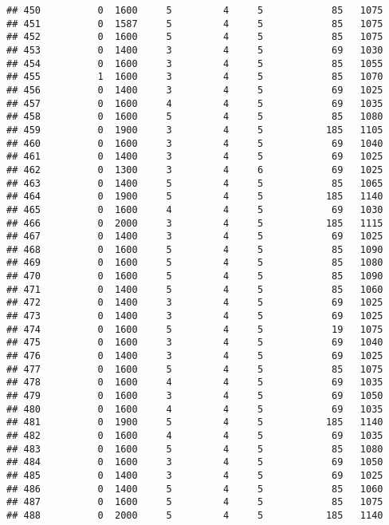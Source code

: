 \documentclass[]{article}
\begin{document}
\begin{verbatim}
## 450          0  1600     5         4     5            85   1075
## 451          0  1587     5         4     5            85   1075
## 452          0  1600     5         4     5            85   1075
## 453          0  1400     3         4     5            69   1030
## 454          0  1600     3         4     5            85   1055
## 455          1  1600     3         4     5            85   1070
## 456          0  1400     3         4     5            69   1025
## 457          0  1600     4         4     5            69   1035
## 458          0  1600     5         4     5            85   1080
## 459          0  1900     3         4     5           185   1105
## 460          0  1600     3         4     5            69   1040
## 461          0  1400     3         4     5            69   1025
## 462          0  1300     3         4     6            69   1025
## 463          0  1400     5         4     5            85   1065
## 464          0  1900     5         4     5           185   1140
## 465          0  1600     4         4     5            69   1030
## 466          0  2000     3         4     5           185   1115
## 467          0  1400     3         4     5            69   1025
## 468          0  1600     5         4     5            85   1090
## 469          0  1600     5         4     5            85   1080
## 470          0  1600     5         4     5            85   1090
## 471          0  1400     5         4     5            85   1060
## 472          0  1400     3         4     5            69   1025
## 473          0  1400     3         4     5            69   1025
## 474          0  1600     5         4     5            19   1075
## 475          0  1600     3         4     5            69   1040
## 476          0  1400     3         4     5            69   1025
## 477          0  1600     5         4     5            85   1075
## 478          0  1600     4         4     5            69   1035
## 479          0  1600     3         4     5            69   1050
## 480          0  1600     4         4     5            69   1035
## 481          0  1900     5         4     5           185   1140
## 482          0  1600     4         4     5            69   1035
## 483          0  1600     5         4     5            85   1080
## 484          0  1600     3         4     5            69   1050
## 485          0  1400     3         4     5            69   1025
## 486          0  1400     5         4     5            85   1060
## 487          0  1600     5         4     5            85   1075
## 488          0  2000     5         4     5           185   1140

\end{verbatim}
\end{document}
